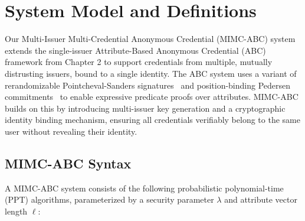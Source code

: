 \section{System Model and Definitions}

Our Multi-Issuer Multi-Credential Anonymous Credential (MIMC-ABC) system extends the single-issuer Attribute-Based Anonymous Credential (ABC) framework from Chapter 2 to support credentials from multiple, mutually distrusting issuers, bound to a single identity. The ABC system uses a variant of rerandomizable Pointcheval-Sanders signatures~\cite{sako_short_2016} and position-binding Pedersen commitments~\cite{tomescu_utt_2022} to enable expressive predicate proofs over attributes. MIMC-ABC builds on this by introducing multi-issuer key generation and a cryptographic identity binding mechanism, ensuring all credentials verifiably belong to the same user without revealing their identity.

\subsection{MIMC-ABC Syntax}

A MIMC-ABC system consists of the following probabilistic polynomial-time (PPT) algorithms, parameterized by a security parameter $\lambda$ and attribute vector length $\ell$:

